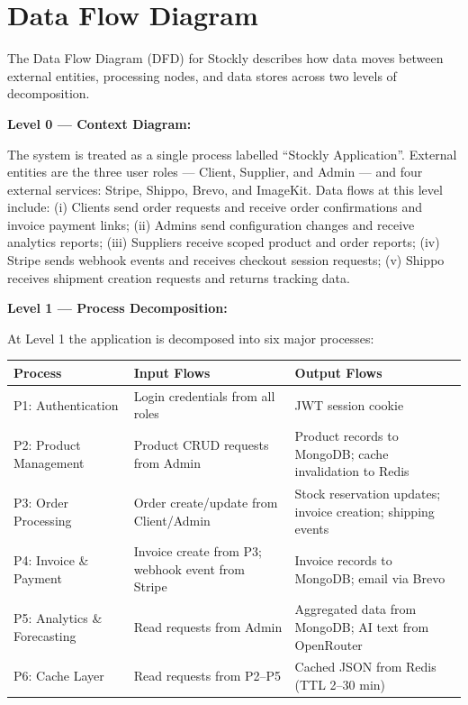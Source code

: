 \documentclass[12pt,a4paper]{report}
\begin{document}
\section{Data Flow Diagram}

The Data Flow Diagram (DFD) for Stockly describes how data moves between external entities, processing nodes, and data stores across two levels of decomposition.

\textbf{Level 0 --- Context Diagram:}

The system is treated as a single process labelled ``Stockly Application''. External entities are the three user roles --- Client, Supplier, and Admin --- and four external services: Stripe, Shippo, Brevo, and ImageKit. Data flows at this level include: (i) Clients send order requests and receive order confirmations and invoice payment links; (ii) Admins send configuration changes and receive analytics reports; (iii) Suppliers receive scoped product and order reports; (iv) Stripe sends webhook events and receives checkout session requests; (v) Shippo receives shipment creation requests and returns tracking data.

\textbf{Level 1 --- Process Decomposition:}

At Level 1 the application is decomposed into six major processes:

\begin{center}
\begin{tabularx}{\textwidth}{lXX}
    \toprule
    \textbf{Process} & \textbf{Input Flows} & \textbf{Output Flows} \\
    \midrule
    P1: Authentication & Login credentials from all roles & JWT session cookie \\
    P2: Product Management & Product CRUD requests from Admin & Product records to MongoDB; cache invalidation to Redis \\
    P3: Order Processing & Order create/update from Client/Admin & Stock reservation updates; invoice creation; shipping events \\
    P4: Invoice \& Payment & Invoice create from P3; webhook event from Stripe & Invoice records to MongoDB; email via Brevo \\
    P5: Analytics \& Forecasting & Read requests from Admin & Aggregated data from MongoDB; AI text from OpenRouter \\
    P6: Cache Layer & Read requests from P2--P5 & Cached JSON from Redis (TTL 2--30 min) \\
    \bottomrule
\end{tabularx}
\end{center}
\end{document}

